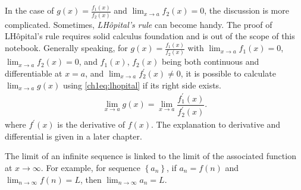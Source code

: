 In the case of $g(x)=\frac{f_1(x)}{f_2(x)}$ and $\lim_{x \rightarrow a}f_2(x) = 0$, the discussion is more complicated. Sometimes, \textit{L\textprime H\^opital's rule} can become handy. The proof of L\textprime H\^opital's rule requires solid calculus foundation and is out of the scope of this notebook. Generally speaking, for $g(x)=\frac{f_1(x)}{f_2(x)}$ with $\lim_{x\rightarrow a}f_1(x) = 0$, $\lim_{x\rightarrow a}f_2(x) = 0$, and $f_1(x)$, $f_2(x)$ being both continuous and differentiable at $x=a$, and $\lim_{x\rightarrow a}f_2^\prime(x) \neq 0$, it is possible to calculate $\lim_{x\rightarrow a}g(x)$ using \eqref{ch1eq:lhopital} if its right side exists.
\begin{eqnarray}
  \lim_{x\rightarrow a}g(x) = \lim_{x\rightarrow a} \dfrac{f_1^\prime(x)}{f_2^\prime(x)}. \label{ch1eq:lhopital}
\end{eqnarray}
where $f^\prime(x)$ is the derivative of $f(x)$. The explanation to derivative and differential is given in a later chapter.

The limit of an infinite sequence is linked to the limit of the associated function at $x\rightarrow\infty$. For example, for sequence $\left\{a_n\right\}$, if $a_n=f(n)$ and $\lim_{n\rightarrow\infty}f(n)=L$, then $\lim_{n\rightarrow\infty}a_n=L$.
